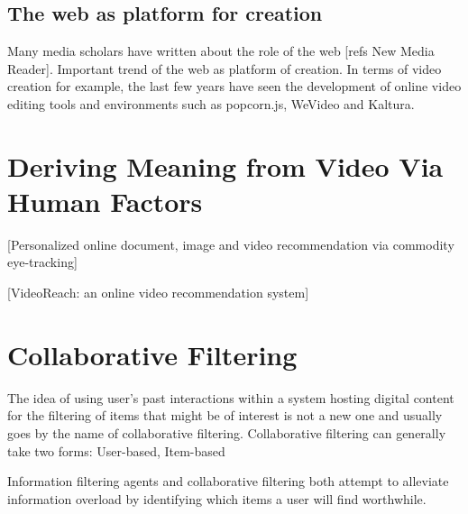 


\subsection{The web as platform for creation}
\label{sec:platform}
Many media scholars have written about the role of the web [refs New Media Reader].
Important trend of the web as platform of creation. In terms of video creation for example, the last few years have seen the development of online video editing tools and environments such as popcorn.js, WeVideo and Kaltura.



\section{Deriving Meaning from Video Via Human Factors}
[Personalized online document, image and video recommendation via commodity eye-tracking]\cite{Xu:2008vb}

[VideoReach: an online video recommendation system]\cite{Mei:2007wa}

\section{Collaborative Filtering} 


The idea of using user's past interactions within a system hosting digital content for the filtering of items that might be of interest is not a new one and usually goes by the name of collaborative filtering. 
Collaborative filtering can generally take two forms: User-based, Item-based

Information filtering agents and collaborative filtering both
attempt to alleviate information overload by identifying
which items a user will find worthwhile.


